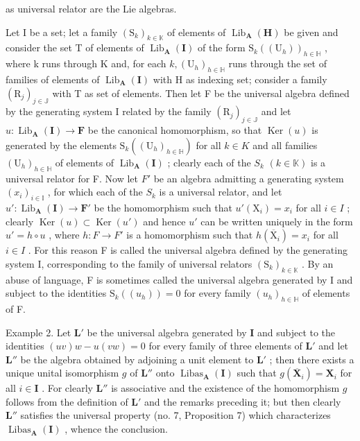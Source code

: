 as universal relator are the Lie algebras.

Let I be a set; let a family \((\mathrm{S}_{k})_{k\in\mathbb{K}}\) of elements of \(\operatorname{Lib}_{\mathbf{A}}(\mathbf{H})\) be given and consider the set T of elements of \(\operatorname{Lib}_{\mathbf{A}}(\mathbf{I})\) of the form \(\mathrm{S}_{k}((\mathrm{U}_{h}))_{h\in\mathbb{H}}\) , where k runs through K and, for each \(k,\left(\mathrm{U}_{h}\right)_{h\in\mathbb{H}}\) runs through the set of families of elements of \(\operatorname{Lib}_{\mathbf{A}}(\mathbf{I})\) with H as indexing set; consider a family \((\mathrm{R}_{j})_{j\in\mathbb{J}}\) with T as set of elements. Then let F be the universal algebra defined by the generating system I related by the family \((\mathrm{R}_{j})_{j\in\mathbb{J}}\) and let \(u:\operatorname{Lib}_{\mathbf{A}}(\mathbf{I})\to\mathbf{F}\) be the canonical homomorphism, so that \(\operatorname{Ker}(u)\) is generated by the elements \(\mathrm{S}_{k}((\mathrm{U}_{h})_{h\in\mathbb{H}})\) for all \(k\in K\) and all families \((\mathrm{U}_{h})_{h\in\mathbb{H}}\) of elements of \(\operatorname{Lib}_{\mathbf{A}}(\mathbf{I})\) ; clearly each of the \(S_{k}\) \((k\in\mathbb{K})\) is a universal relator for F. Now let \(F'\) be an algebra admitting a generating system \((x_{i})_{i\in\mathbb{I}}\) , for which each of the \(S_{k}\) is a universal relator, and let \(u':\operatorname{Lib}_{\mathbf{A}}(\mathbf{I})\to\mathbf{F}'\) be the homomorphism such that \(u'(\mathrm{X}_{i})=x_{i}\) for all \(i\in I\) ; clearly \(\operatorname{Ker}(u)\subset\operatorname{Ker}(u')\) and hence \(u'\) can be written uniquely in the form \(u'=h\circ u\) , where \(h:F\to F'\) is a homomorphism such that \(h(\overline{\mathrm{X}}_{i})=x_{i}\) for all \(i\in I\) . For this reason F is called the universal algebra defined by the generating system I, corresponding to the family of universal relators \((\mathrm{S}_{k})_{k\in\mathbb{K}}\) . By an abuse of language, F is sometimes called the universal algebra generated by I and subject to the identities \(\mathrm{S}_{k}((u_{h}))=0\) for every family \((u_{h})_{h\in\mathbb{H}}\) of elements of F.

Example 2. Let \(\mathbf{L}'\) be the universal algebra generated by \(\mathbf{I}\) and subject to the identities \((uv)w - u(vw) = 0\) for every family of three elements of \(\mathbf{L}'\) and let \(\mathbf{L}''\) be the algebra obtained by adjoining a unit element to \(\mathbf{L}'\) ; then there exists a unique unital isomorphism \(g\) of \(\mathbf{L}''\) onto \(\operatorname{Libas}_{\mathbf{A}}(\mathbf{I})\) such that \(g(\overline{\mathbf{X}}_i) = \mathbf{X}_i\) for all \(i \in \mathbf{I}\) . For clearly \(\mathbf{L}''\) is associative and the existence of the homomorphism \(g\) follows from the definition of \(\mathbf{L}'\) and the remarks preceding it; but then clearly \(\mathbf{L}''\) satisfies the universal property (no. 7, Proposition 7) which characterizes \(\operatorname{Libas}_{\mathbf{A}}(\mathbf{I})\) , whence the conclusion.

